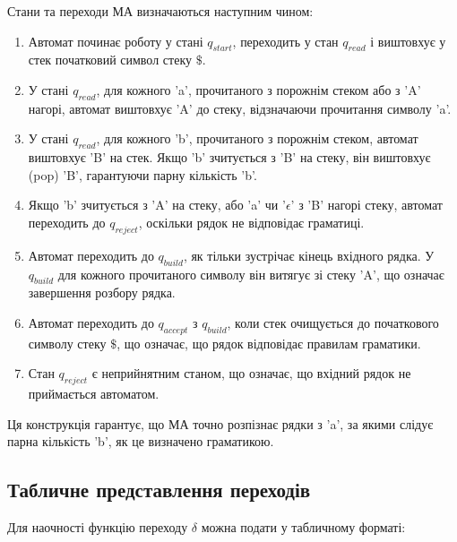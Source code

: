 \documentclass[12pt,a4paper]{article}
\begin{document}
Стани та переходи МА визначаються наступним чином:

\begin{enumerate}
    \item Автомат починає роботу у стані \( q_{start} \), переходить у стан \( q_{read} \) і виштовхує у стек початковий символ стеку \( \$ \).
    \item У стані \( q_{read} \), для кожного 'a', прочитаного з порожнім стеком або з 'A' нагорі, автомат виштовхує 'A' до стеку, відзначаючи прочитання символу 'a'.
    \item У стані \( q_{read} \), для кожного 'b', прочитаного з порожнім стеком, автомат виштовхує 'B' на стек. Якщо 'b' зчитується з 'B' на стеку, він виштовхує (pop) 'B', гарантуючи парну кількість 'b'.
    \item Якщо 'b' зчитується з 'A' на стеку, або 'a' чи '\( \epsilon \)' з 'B' нагорі стеку, автомат переходить до \( q_{reject} \), оскільки рядок не відповідає граматиці.
    \item Автомат переходить до \( q_{build} \), як тільки зустрічає кінець вхідного рядка. У \( q_{build} \) для кожного прочитаного символу він витягує зі стеку 'A', що означає завершення розбору рядка.
    \item Автомат переходить до \( q_{accept} \) з \( q_{build} \), коли стек очищується до початкового символу стеку \( \$ \), що означає, що рядок відповідає правилам граматики.
    \item Стан \( q_{reject} \) є неприйнятним станом, що означає, що вхідний рядок не приймається автоматом.
\end{enumerate}

Ця конструкція гарантує, що МА точно розпізнає рядки з 'a', за якими слідує парна кількість 'b', як це визначено граматикою.

\subsection*{Табличне представлення переходів}
Для наочності функцію переходу \( \delta \) можна подати у табличному форматі:
\end{document}
